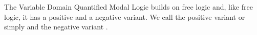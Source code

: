 \documentclass[../../../../include/open-logic-section]{subfiles}
\begin{document}


The Variable Domain Quantified Modal Logic builds on free logic and,
like free logic, it has a positive and a negative variant. We 
call the positive variant  or simply  and 
the negative variant .
\end{document}
